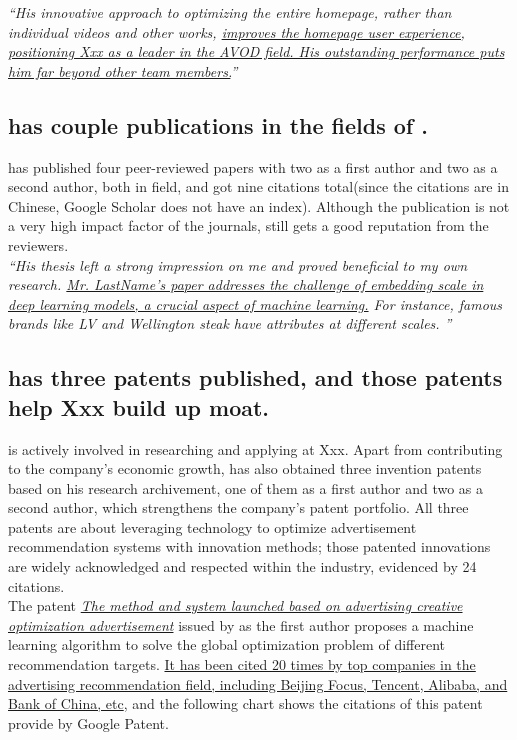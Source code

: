 \documentclass[11pt]{article}
\let\oldenquote\enquote
\renewcommand{\enquote}[1]{{\itshape\oldenquote{#1}}}
\begin{document}
\enquote{His innovative approach to optimizing the entire homepage, rather than individual videos and other works, \ul{improves the homepage user experience, positioning Xxx as a leader in the AVOD field. His outstanding performance puts him far beyond other team members.}} 


\subsection{ \dr has couple publications in the fields of \fie{}.}
\label{papers}

\dr has published four peer-reviewed papers with two as a first author and two as a second author, both in \fie{} field, and got nine citations total(since the citations are in Chinese, Google Scholar does not have an index). Although the publication is not a very high impact factor of the journals, \dr still gets a good reputation from the reviewers. \cite{papers} \\

\enquote{His thesis left a strong impression on me and proved beneficial to my own research. \ul{Mr. LastName's paper addresses the challenge of embedding scale in deep learning models, a crucial aspect of machine learning.} For instance, famous brands like LV and Wellington steak have attributes at different scales. } 


\subsection{ \dr has three patents published, and those patents help Xxx build up moat. }
\label{patents}

\dr is actively involved in researching and applying \fie{} at Xxx. Apart from contributing to the company's economic growth, \dr has also obtained three invention patents based on his research archivement, one of them as a first author and two as a second author, which strengthens the company's patent portfolio. All three patents are about leveraging \fie{} technology to optimize advertisement recommendation systems with innovation methods; those patented innovations are widely acknowledged and respected within the industry, evidenced by 24 citations. \cite{patents} \\

The patent \textit{\ul{The method and system launched based on advertising creative optimization advertisement}} issued by \dr as the first author proposes a machine learning algorithm to solve the global optimization problem of different recommendation targets. \ul{It has been cited 20 times by top companies in the advertising recommendation field, including Beijing Focus, Tencent, Alibaba, and Bank of China, etc}, and the following chart shows the citations of this patent provide by Google Patent. \cite{patents} \\
\end{document}

